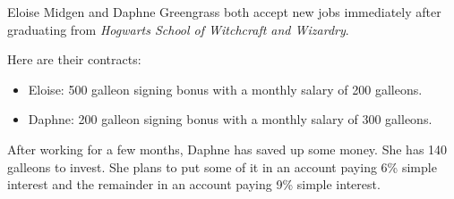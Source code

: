 \documentclass[letterpaper, landscape]{exam}
\begin{document}
\begin{questions}
    \ifprintanswers{}
      \newpage
    \fi

    \question{}
    Eloise Midgen and Daphne Greengrass both accept new jobs immediately after graduating from
    {\em Hogwarts School of Witchcraft and Wizardry}. 
    
    Here are their contracts:

    \begin{itemize}
      \item Eloise: 500 galleon signing bonus with a monthly salary of 200 galleons. 
      \item Daphne: 200 galleon signing bonus with a monthly salary of 300 galleons. 
    \end{itemize}



    \ifprintanswers{}
      \newpage
    \fi

    \question[15]
    After working for a few months, Daphne has saved up some money. She has 140 galleons to
    invest. She plans to put some of it in an account paying 6\% simple interest and the remainder
    in an account paying 9\% simple interest. 
    

\end{questions}
\end{document}
